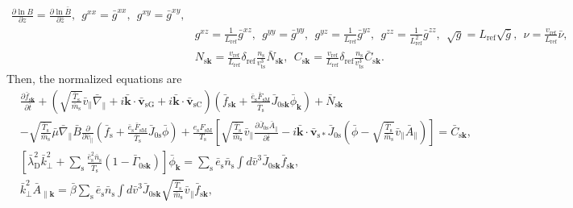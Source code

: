 \begin{align}
  \frac{\partial \ln B}{\partial z} = \frac{\partial \ln \bar{B}}{\partial \bar{z}},~~
  g^{xx} = \bar{g}^{xx},~~
  g^{xy} = \bar{g}^{xy}, \nonumber \\
  &g^{xz} = \frac{1}{L_\mathrm{ref}} \bar{g}^{xz},~~
  g^{yy} = \bar{g}^{yy},~~
  g^{yz} = \frac{1}{L_\mathrm{ref}} \bar{g}^{yz},~~
  g^{zz} = \frac{1}{L_\mathrm{ref}^2} \bar{g}^{zz},~~
  \sqrt{g} = L_\mathrm{ref} \sqrt{\bar{g}},~~
  \nu = \frac{v_\mathrm{ref}}{L_\mathrm{ref}} \bar{\nu}, \nonumber \\ 
  &N_{\mathrm{s}\bm{k}} = \frac{v_\mathrm{ref}}{L_\mathrm{ref}}\delta_\mathrm{ref} \frac{n_\mathrm{s}}{v_\mathrm{ts}^3} \bar{N}_{\mathrm{s}\bm{k}},~~
  C_{\mathrm{s}\bm{k}} = \frac{v_\mathrm{ref}}{L_\mathrm{ref}}\delta_\mathrm{ref} \frac{n_\mathrm{s}}{v_\mathrm{ts}^3} \bar{C}_{\mathrm{s}\bm{k}}.
\end{align}
Then, the normalized equations are
\begin{align}
  &\frac{\partial \bar{f}_{\mathrm{s}\bm{k}}}{\partial \bar{t}} + \left( \sqrt{\frac{\bar{T}_\mathrm{s}}{\bar{m}_\mathrm{s}}} \bar{v}_\parallel \bar{\nabla}_\parallel + i \bar{\bm{k}} \cdot \bar{\bm{v}}_\mathrm{sG} + i \bar{\bm{k}} \cdot \bar{\bm{v}}_\mathrm{sC} \right) \left( \bar{f}_{\mathrm{s}\bm{k}} + \frac{\bar{e}_\mathrm{s} \bar{F}_\mathrm{sM}}{\bar{T}_\mathrm{s}} \bar{J}_{0\mathrm{s}\bm{k}} \bar{\phi}_{\bm{k}} \right) + \bar{N}_{\mathrm{s}\bm{k}} \nonumber \\
  &- \sqrt{\frac{\bar{T}_\mathrm{s}}{\bar{m}_\mathrm{s}}} \bar{\mu} \bar{\nabla}_\parallel \bar{B} \frac{\partial}{\partial \bar{v}_\parallel} \left( \bar{f}_\mathrm{s} + \frac{\bar{e}_\mathrm{s} \bar{F}_\mathrm{sM}}{\bar{T}_\mathrm{s}} \bar{J}_{0\mathrm{s}} \bar{\phi} \right) + \frac{e_\mathrm{s} F_\mathrm{sM}}{T_\mathrm{s}} \left[ \sqrt{\frac{\bar{T}_\mathrm{s}}{\bar{m}_\mathrm{s}}} \bar{v}_\parallel \frac{\partial \bar{J}_{0\mathrm{s}} \bar{A}_\parallel}{\partial \bar{t}} - i \bar{\bm{k}} \cdot \bar{\bm{v}}_{\mathrm{s}*} \bar{J}_{0\mathrm{s}} (\bar{\phi} - \sqrt{\frac{\bar{T}_\mathrm{s}}{\bar{m}_\mathrm{s}}} \bar{v}_\parallel \bar{A}_\parallel) \right] = \bar{C}_{\mathrm{s}\bm{k}}, 
  \label{eq:vlasoveq_normalized}\\
  &\left[ \bar{\lambda}_\mathrm{D}^2 \bar{k}_\perp^2 + \sum_\mathrm{s} \frac{\bar{e}_\mathrm{s}^2 \bar{n}_\mathrm{s}}{\bar{T}_\mathrm{s}} \left( 1 - \bar{\Gamma}_{0\mathrm{s}\bm{k}} \right) \right] \bar{\phi}_{\bm{k}} = \sum_\mathrm{s} \bar{e}_\mathrm{s} \bar{n}_\mathrm{s} \int d\bar{v}^3 \bar{J}_{0\mathrm{s}\bm{k}} \bar{f}_{\mathrm{s}\bm{k}}, 
  \label{eq:poissoneq_normalized}\\
  &\bar{k}_\perp^2 \bar{A}_{\parallel\bm{k}} = \bar{\beta} \sum_\mathrm{s} \bar{e}_\mathrm{s} \bar{n}_\mathrm{s} \int d\bar{v}^3 \bar{J}_{0\mathrm{s}\bm{k}} \sqrt{\frac{\bar{T}_\mathrm{s}}{\bar{m}_\mathrm{s}}} \bar{v}_\parallel \bar{f}_{\mathrm{s}\bm{k}},
  \label{eq:ampereeq_normalized}
\end{align}
